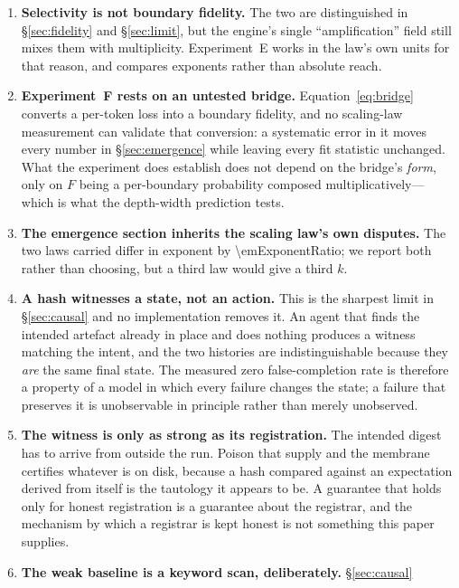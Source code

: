 \documentclass[conference]{IEEEtran}
\theoremstyle{definition}
\begin{document}
\begin{enumerate}
cryostat/scaffold contrast is precisely where they diverge---a cryostat rejects
noise by rejecting nearly everything, including its own support infrastructure.
The \emph{ratios} in Table~\ref{tab:noise} survive that objection; the absolute
over-budget factors do not.
\item \textbf{Selectivity is not boundary fidelity.} The two are distinguished in
\S\ref{sec:fidelity} and \S\ref{sec:limit}, but the engine's single
``amplification'' field still mixes them with multiplicity. Experiment~E works in
the law's own units for that reason, and compares exponents rather than absolute
reach.
\item \textbf{Experiment~F rests on an untested bridge.} Equation~\eqref{eq:bridge}
converts a per-token loss into a boundary fidelity, and no scaling-law measurement
can validate that conversion: a systematic error in it moves every number in
\S\ref{sec:emergence} while leaving every fit statistic unchanged. What the
experiment does establish does not depend on the bridge's \emph{form}, only on
$F$ being a per-boundary probability composed multiplicatively---which is what the
depth-width prediction tests.
\item \textbf{The emergence section inherits the scaling law's own disputes.} The
two laws carried differ in exponent by \num{\emExponentRatio}; we report both
rather than choosing, but a third law would give a third $k$.
\item \textbf{A hash witnesses a state, not an action.} This is the sharpest limit
in \S\ref{sec:causal} and no implementation removes it. An agent that finds the
intended artefact already in place and does nothing produces a witness matching
the intent, and the two histories are indistinguishable because they \emph{are}
the same final state. The measured zero false-completion rate is therefore a
property of a model in which every failure changes the state; a failure that
preserves it is unobservable in principle rather than merely unobserved.
\item \textbf{The witness is only as strong as its registration.} The intended
digest has to arrive from outside the run. Poison that supply and the membrane
certifies whatever is on disk, because a hash compared against an expectation
derived from itself is the tautology it appears to be. A guarantee that holds only
for honest registration is a guarantee about the registrar, and the mechanism by
which a registrar is kept honest is not something this paper supplies.
\item \textbf{The weak baseline is a keyword scan, deliberately.} \S\ref{sec:causal}

\end{enumerate}
\end{document}
